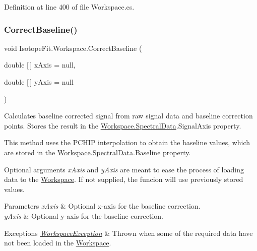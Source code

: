 Definition at line 400 of file Workspace.\+cs.

\mbox{\label{class_isotope_fit_1_1_workspace_aa0b81213937d49ae3a6183563cfe0f60}} 
\subsubsection{\texorpdfstring{Correct\+Baseline()}{CorrectBaseline()}}
{\footnotesize\ttfamily void Isotope\+Fit.\+Workspace.\+Correct\+Baseline (\begin{DoxyParamCaption}\item[{double \mbox{[}$\,$\mbox{]}}]{x\+Axis = {\ttfamily null},  }\item[{double \mbox{[}$\,$\mbox{]}}]{y\+Axis = {\ttfamily null} }\end{DoxyParamCaption})}



Calculates baseline corrected signal from raw signal data and baseline correction points. Stores the result in the \hyperlink{class_isotope_fit_1_1_workspace_a1d6cc2dd07cbfe920da9f1bffc9b32c2}{Workspace.\+Spectral\+Data}.Signal\+Axis property. 

This method uses the P\+C\+H\+IP interpolation to obtain the baseline values, which are stored in the \hyperlink{class_isotope_fit_1_1_workspace_a1d6cc2dd07cbfe920da9f1bffc9b32c2}{Workspace.\+Spectral\+Data}.Baseline property.

Optional arguments {\itshape x\+Axis}  and {\itshape y\+Axis}  are meant to ease the process of loading data to the \hyperlink{class_isotope_fit_1_1_workspace}{Workspace}. If not supplied, the funcion will use previously stored values.


\begin{DoxyParams}{Parameters}
{\em x\+Axis} & Optional x-\/axis for the baseline correction.\\
\hline
{\em y\+Axis} & Optional y-\/axis for the baseline correction.\\
\hline
\end{DoxyParams}

\begin{DoxyExceptions}{Exceptions}
{\em \hyperlink{class_isotope_fit_1_1_workspace_exception}{Workspace\+Exception}} & Thrown when some of the required data have not been loaded in the \hyperlink{class_isotope_fit_1_1_workspace}{Workspace}.\\
\hline
\end{DoxyExceptions}


